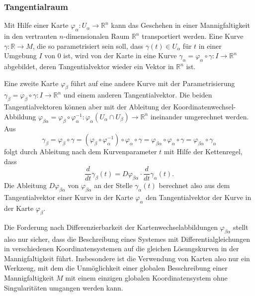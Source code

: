 \subsubsection{Tangentialraum}
Mit Hilfe einer Karte $\varphi_\alpha\colon U_\alpha\to\mathbb{R}^n$
kann das Geschehen in einer Mannigfaltigkeit in den vertrauten 
$n$-dimensionalen Raum $\mathbb{R}^n$ transportiert werden. 
Eine Kurve $\gamma\colon \mathbb{R}\to M$, die so parametrisiert sein
soll, dass $\gamma(t)\in U_\alpha$ für $t$ in einer Umgebung $I$ von $0$ ist,
wird von der Karte in eine Kurve
$\gamma_\alpha=\varphi_\alpha\circ\gamma\colon I\to \mathbb{R}^n$ 
abgebildet,
deren Tangentialvektor wieder ein Vektor in $\mathbb{R}^n$ ist.

Eine zweite Karte $\varphi_\beta$ führt auf eine andere Kurve
mit der Parametrisierung
$\gamma_\beta=\varphi_\beta\circ\gamma\colon I \to \mathbb{R}^n$ 
und einem anderen Tangentialvektor.
Die beiden Tangentialvektoren können aber mit der Ableitung der
Koordinatenwechsel-Abbildung
$\varphi_{\beta\alpha}=\varphi_\beta\circ\varphi_\alpha^{-1}\colon
\varphi_\alpha(U_\alpha\cap U_\beta)\to \mathbb{R}^n$
ineinander umgerechnet werden.
Aus
\[
\gamma_\beta
=
\varphi_\beta\circ \gamma
=
(
\varphi_\beta
\circ
\varphi_\alpha^{-1}
)
\circ
\varphi_\alpha\circ\gamma
=
\varphi_{\beta\alpha}
\circ
\varphi_\alpha\circ\gamma
=
\varphi_{\beta\alpha}\circ\gamma_\alpha
\]
folgt durch Ableitung nach dem Kurvenparameter $t$ mit Hilfe der
Kettenregel, dass
\[
\frac{d}{dt}\gamma_\beta(t)
=
D\varphi_{\beta\alpha}
\cdot
\frac{d}{dt}\gamma_\alpha(t).
\]
Die Ableitung $D\varphi_{\beta\alpha}$ von $\varphi_{\beta\alpha}$ 
an der Stelle $\gamma_\alpha(t)$ berechnet also aus dem Tangentialvektor
einer Kurve in der Karte $\varphi_\alpha$ den Tangentialvektor der
Kurve in der Karte $\varphi_\beta$.

Die Forderung nach Differenzierbarkeit der Kartenwechselabbildungen
$\varphi_{\beta\alpha}$ stellt also nur sicher, dass die Beschreibung
eines Systemes mit Differentialgleichungen in verschiedenen
Koordinatensystemen auf die gleichen Lösungskurven in der
Mannigfaltigkeit führt.
Insbesondere ist die Verwendung von Karten also nur ein Werkzeug,
mit dem die Unmöglichkeit einer globalen Besschreibung einer
Mannigfaltigkeit $M$ mit einem einzigen globalen Koordinatensystem
ohne Singularitäten umgangen werden kann.

